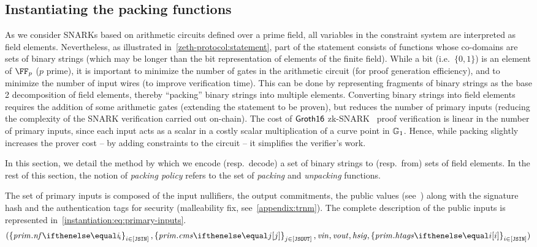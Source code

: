 \subsection{Instantiating the packing functions}\label{instantiation:statement:pack}

As we consider SNARKs based on arithmetic circuits defined over a prime field, all variables in the constraint system are interpreted as field elements. Nevertheless, as illustrated in~\cref{zeth-protocol:statement}, part of the statement consists of functions whose co-domains are sets of binary strings (which may be longer than the bit representation of elements of the finite field). While a bit (i.e.~$\{0, 1\}$) is an element of $\FF_p$ ($p$ prime), it is important to minimize the number of gates in the arithmetic circuit (for proof generation efficiency), and to minimize the number of input wires (to improve verification time). This can be done by representing fragments of binary strings as the base 2 decomposition of field elements, thereby ``packing'' binary strings into multiple elements. Converting binary strings into field elements requires the addition of some arithmetic gates (extending the statement to be proven), but reduces the number of primary inputs (reducing the complexity of the SNARK verification carried out on-chain).
The cost of $\mathsf{Groth16}$ zk-SNARK~\cite{groth2016size} proof verification is linear in the number of primary inputs, since each input acts as a scalar in a costly scalar multiplication of a curve point in $\mathbb{G}_1$. Hence, while packing slightly increases the prover cost -- by adding constraints to the circuit -- it simplifies the verifier's work.

In this section, we detail the method by which we encode (resp.~decode) a set of binary strings to (resp.~from) sets of field elements. In the rest of this section, the notion of \emph{packing policy} refers to the set of \emph{packing} and \emph{unpacking} functions.

The set of primary inputs is composed of the input nullifiers, the output commitments, the public values (see~\cite[Section 3.4.3]{zethpaper}) along with the signature hash and the authentication tags for security (malleability fix, see~\cref{appendix:trnm}). The complete description of the public inputs is represented in~\cref{instantiation:eq:primary-inputs}.
%
\begin{equation}\label{instantiation:eq:primary-inputs}
    (\indexedset{\priminputs.\nf{i}}{i \in [\jsin]}, \indexedset{\priminputs.\cms{j}}{j \in [\jsout]}, \vin, \vout, \hsig, \indexedset{\priminputs.\htags{i}}{i \in [\jsin]})
\end{equation}

